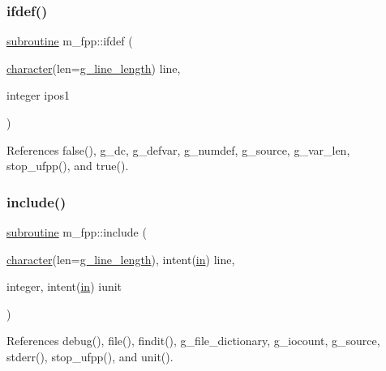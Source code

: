 \subsubsection{\texorpdfstring{ifdef()}{ifdef()}}
{\footnotesize\ttfamily \hyperlink{M__stopwatch_83_8txt_acfbcff50169d691ff02d4a123ed70482}{subroutine} m\+\_\+fpp\+::ifdef (\begin{DoxyParamCaption}\item[{\hyperlink{option__stopwatch_83_8txt_abd4b21fbbd175834027b5224bfe97e66}{character}(len=\hyperlink{namespacem__fpp_ab93f8756cf248cf8db932573009d4664}{g\+\_\+line\+\_\+length})}]{line,  }\item[{integer}]{ipos1 }\end{DoxyParamCaption})}



References false(), g\+\_\+dc, g\+\_\+defvar, g\+\_\+numdef, g\+\_\+source, g\+\_\+var\+\_\+len, stop\+\_\+ufpp(), and true().

\mbox{\label{namespacem__fpp_ae2b0d4bedb5c55788d054fefdef54fcc}} 
\subsubsection{\texorpdfstring{include()}{include()}}
{\footnotesize\ttfamily \hyperlink{M__stopwatch_83_8txt_acfbcff50169d691ff02d4a123ed70482}{subroutine} m\+\_\+fpp\+::include (\begin{DoxyParamCaption}\item[{\hyperlink{option__stopwatch_83_8txt_abd4b21fbbd175834027b5224bfe97e66}{character}(len=\hyperlink{namespacem__fpp_ab93f8756cf248cf8db932573009d4664}{g\+\_\+line\+\_\+length}), intent(\hyperlink{M__journal_83_8txt_afce72651d1eed785a2132bee863b2f38}{in})}]{line,  }\item[{integer, intent(\hyperlink{M__journal_83_8txt_afce72651d1eed785a2132bee863b2f38}{in})}]{iunit }\end{DoxyParamCaption})}



References debug(), file(), findit(), g\+\_\+file\+\_\+dictionary, g\+\_\+iocount, g\+\_\+source, stderr(), stop\+\_\+ufpp(), and unit().

\mbox{\label{namespacem__fpp_ae2377b0a62c6cfcf80593df3126cd45f}} 
